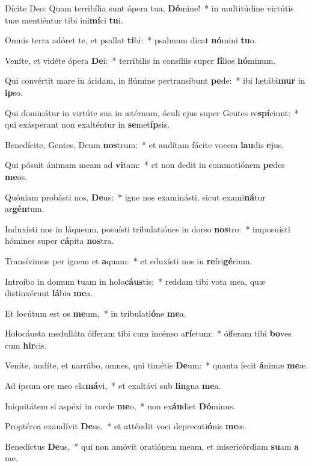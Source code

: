 \item Dícite Deo: Quam terribília sunt ópera tua, \textbf{Dó}mine!~* in multitúdine virtútis tuæ mentiéntur tibi ini\textbf{mí}ci \textbf{tu}i.
\item Omnis terra adóret te, et psallat \textbf{ti}bi:~* psalmum dicat \textbf{nó}mini \textbf{tu}o.
\item Veníte, et vidéte ópera \textbf{De}i:~* terríbilis in consíliis super \textbf{fí}lios \textbf{hó}minum.
\item Qui convértit mare in áridam, in flúmine pertransíbunt \textbf{pe}de:~* ibi lætábi\textbf{mur} in \textbf{ip}so.
\item Qui dominátur in virtúte sua in ætérnum, óculi ejus super Gentes re\textbf{spí}ciunt:~* qui exásperant non exalténtur in \textbf{se}met\textbf{íp}sis.
\item Benedícite, Gentes, Deum \textbf{nos}trum:~* et audítam fácite vocem \textbf{lau}dis \textbf{e}jus,
\item Qui pósuit ánimam meam ad \textbf{vi}tam:~* et non dedit in commotiónem \textbf{pe}des \textbf{me}os.
\item Quóniam probásti nos, \textbf{De}us:~* igne nos examinásti, sicut exami\textbf{ná}tur ar\textbf{gén}tum.
\item Induxísti nos in láqueum, posuísti tribulatiónes in dorso \textbf{nos}tro:~* imposuísti hómines super \textbf{cá}pita \textbf{nos}tra.
\item Transívimus per ignem et \textbf{a}quam:~* et eduxísti nos in \textbf{re}fri\textbf{gé}rium.
\item Introíbo in domum tuam in holo\textbf{cáus}tis:~* reddam tibi vota mea, quæ distinxérunt \textbf{lá}bia \textbf{me}a.
\item Et locútum est os \textbf{me}um,~* in tribulati\textbf{ó}ne \textbf{me}a.
\item Holocáusta medulláta ófferam tibi cum incénso a\textbf{rí}etum:~* ófferam tibi \textbf{bo}ves cum \textbf{hir}cis.
\item Veníte, audíte, et narrábo, omnes, qui timétis \textbf{De}um:~* quanta fecit \textbf{á}nimæ \textbf{me}æ.
\item Ad ipsum ore meo cla\textbf{má}vi,~* et exaltávi sub \textbf{lin}gua \textbf{me}a.
\item Iniquitátem si aspéxi in corde \textbf{me}o,~* non ex\textbf{áu}diet \textbf{Dó}minus.
\item Proptérea exaudívit \textbf{De}us,~* et atténdit voci deprecati\textbf{ó}nis \textbf{me}æ.
\item Benedíctus \textbf{De}us,~* qui non amóvit oratiónem meam, et misericórdiam \textbf{su}am \textbf{a} me.

